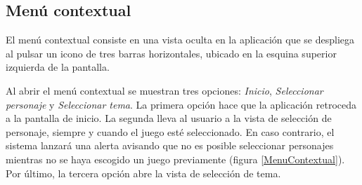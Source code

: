 %
%
%
%

\subsection{Menú contextual}
El menú contextual consiste en una vista oculta en la aplicación que se despliega al pulsar un icono de 
tres barras horizontales, ubicado en la esquina superior izquierda de la pantalla.\medskip

Al abrir el menú contextual se muestran tres opciones: \textit{Inicio}, \textit{Seleccionar personaje} y 
\textit{Seleccionar tema}. La primera opción hace que la aplicación retroceda a la pantalla de inicio.
La segunda lleva al usuario a la vista de selección de personaje, siempre y cuando el juego esté seleccionado. 
En caso contrario, el sistema lanzará una alerta avisando que no es posible seleccionar personajes mientras no 
se haya escogido un juego previamente (figura \ref*{MenuContextual}). Por último, la tercera opción abre la vista de 
selección de tema.

